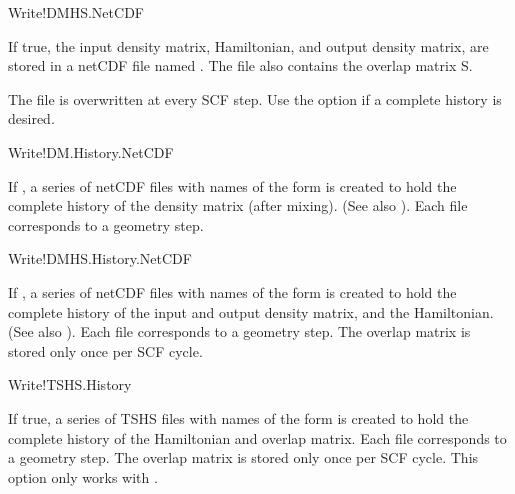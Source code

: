 \begin{fdflogicalT}{Write!DMHS.NetCDF}

  
  If true, the input density matrix, Hamiltonian, and output density
  matrix, are stored in a netCDF file named . The file
  also contains the overlap matrix S.

  The file is overwritten at every SCF step. Use the
   option if a complete history is
  desired.

\end{fdflogicalT}


\begin{fdflogicalF}{Write!DM.History.NetCDF}

  If \fdftrue, a series of netCDF files with names of the form
   is created to hold the complete history of the
  density matrix (after mixing). (See also ). Each
  file corresponds to a geometry step.

\end{fdflogicalF}

\begin{fdflogicalF}{Write!DMHS.History.NetCDF}

  If \fdftrue, a series of netCDF files with names of the form
   is created to hold the complete history of the
  input and output density matrix, and the Hamiltonian.  (See also
  ). Each file corresponds to a geometry
  step. The overlap matrix is stored only once per SCF cycle.

\end{fdflogicalF}

\begin{fdflogicalF}{Write!TSHS.History}

  If true, a series of TSHS files with names of the form
   is created to hold the complete history of the
  Hamiltonian and overlap matrix. Each file corresponds to a geometry
  step. The overlap matrix is stored only once per SCF cycle. This
  option only works with \tsiesta.

\end{fdflogicalF}


